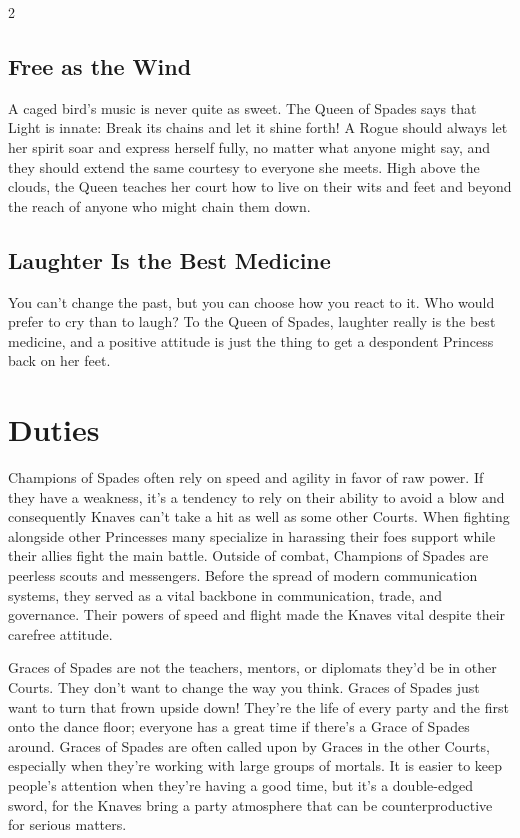 \begin{multicols}{2}
\subsection*{Free as the Wind}

A caged bird's music is never quite as sweet. The Queen of Spades says that Light is innate: Break its chains and let it shine forth! A Rogue should always let her spirit soar and express herself fully, no matter what anyone might say, and they should extend the same courtesy to everyone she meets. High above the clouds, the Queen teaches her court how to live on their wits and feet and beyond the reach of anyone who might chain them down. 

\subsection*{Laughter Is the Best Medicine}

You can't change the past, but you can choose how you react to it. Who would prefer to cry than to laugh? To the Queen of Spades, laughter really is the best medicine, and a positive attitude is just the thing to get a despondent Princess back on her feet.

\section*{Duties}

Champions of Spades often rely on speed and agility in favor of raw power. If they have a weakness, it's a tendency to rely on their ability to avoid a blow and consequently Knaves can't take a hit as well as some other Courts. When fighting alongside other Princesses many specialize in harassing their foes support while their allies fight the main battle. Outside of combat, Champions of Spades are peerless scouts and messengers. Before the spread of modern communication systems, they served as a vital backbone in communication, trade, and governance. Their powers of speed and flight made the Knaves vital despite their carefree attitude.

Graces of Spades are not the teachers, mentors, or diplomats they'd be in other Courts. They don't want to change the way you think. Graces of Spades just want to turn that frown upside down! They're the life of every party and the first onto the dance floor; everyone has a great time if there's a Grace of Spades around. Graces of Spades are often called upon by Graces in the other Courts, especially when they're working with large groups of mortals. It is easier to keep people's attention when they're having a good time, but it's a double-edged sword, for the Knaves bring a party atmosphere that can be counterproductive for serious matters.


\end{multicols}
